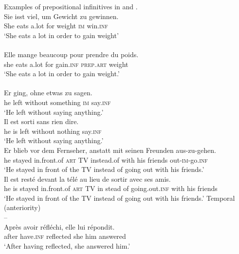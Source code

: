 \documentclass[output=paper]{langscibook}
\begin{document}
\ea Examples of prepositional infinitives in  and .\label{tab:kalm:1}
\ea {} 
\ea {}\\
   \gll Sie   isst   viel,   um   Gewicht   zu   gewinnen.\\
        She  eats  a.lot   for   weight     \textsc{im}   win.\textsc{inf}\\
   \glt ‘She eats a lot in order to gain weight’\\
\ex {}\\
    \gll Elle   mange   beaucoup pour   prendre   du   poids.\\
    she   eats   a.lot for   gain.\textsc{inf}   \textsc{prep.art}   weight \\
\glt ‘She eats a lot in order to gain weight.’\\
\z
\ex {} 
\ea {}\\
\gll Er   ging,   ohne     etwas     zu   sagen.\\
     he   left   without   something   \textsc{im}   say.\textsc{inf}\\
\glt ‘He left without saying anything.’
\ex {}\\
\gll Il   est   sorti   sans     rien     dire.\\
     he   is   left   without   nothing   say.\textsc{inf}\\
\glt ‘He left without saying anything.’
\z
\ex {}
\ea {}\\
\gll Er   blieb   vor     dem   Fernseher,   anstatt mit   seinen   Freunden   aus-zu-gehen.\\
     he   stayed   in.front.of   \textsc{art}   TV     instead.of with   his   friends   out-\textsc{im}{}-go.\textsc{inf}\\
\glt ‘He stayed in front of the TV instead of going out with his friends.’
\ex {}\\
\gll Il   est   resté   devant     la   télé au   lieu   de   sortir     avec   ses   amis.\\
     he   is   stayed   in.front.of   \textsc{art}   TV in   stead   of   going.out.\textsc{inf}    with   his   friends\\
\glt ‘He stayed in front of the TV instead of going out with his friends.’
\z
\ex Temporal (anteriority)
\ea {}\\
    –
\ex {}\\
\gll Après   avoir     réfléchi,   elle   lui   répondit.\\
after   have.\textsc{inf}   reflected   she   him   answered\\
\glt ‘After having reflected, she answered him.’\\
\z
\z
\z
\end{document}
